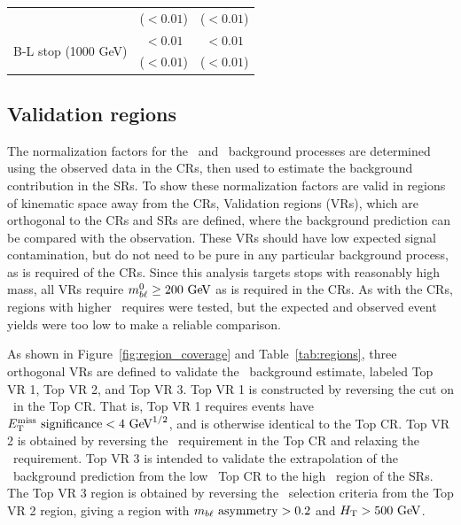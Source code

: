 \begin{table}
{\begin{tabular}{c|cc}
                                           & ($< 0.01$)                        & ($< 0.01$) \vspace{1ex}           \\
      \multirow{2}{*}{B-L stop (1000 GeV)} & $< 0.01$                          & $< 0.01$                          \\
                                           & ($< 0.01$)                        & ($< 0.01$) \vspace{1ex}           \\
      \bottomrule
    \end{tabular}
  }
\end{table}

\FloatBarrier
\subsection{Validation regions}
\label{sec:vr}

The normalization factors for the \TTBAR\ and \ZGAMMAJETS\ background processes
are determined using the observed data in the CRs, then used to estimate the
background contribution in the SRs.
To show these normalization factors are valid in regions of kinematic space away
from the CRs, Validation regions (VRs), which are orthogonal to the CRs and SRs
are defined, where the background prediction can be compared with the
observation.
These VRs should have low expected signal contamination, but do not need to be
pure in any particular background process, as is required of the CRs.
Since this analysis targets stops with reasonably high mass, all VRs require
$\MBL^0 \geq 200 \GeV$ as is required in the CRs.
As with the CRs, regions with higher \MBL\ requires were tested, but the
expected and observed event yields were too low to make a reliable comparison.

As shown in Figure~\ref{fig:region_coverage} and Table~\ref{tab:regions},
three orthogonal VRs are defined to validate the \TTBAR\ background estimate,
labeled Top VR 1, Top VR 2, and Top VR 3.
Top VR 1 is constructed by reversing the cut on \METSIG\ in the Top CR.
That is, Top VR 1 requires events have $\METSIG < 4 \GeV^{1/2}$, and is
otherwise identical to the Top CR.
Top VR 2 is obtained by reversing the \MBLASYM\ requirement in the Top CR and
relaxing the \METSIG\ requirement.
Top VR 3 is intended to validate the extrapolation of the \TTBAR\ background
prediction from the low \HT\ Top CR to the high \HT\ region of the SRs.
The Top VR 3 region is obtained by reversing the \HT\ selection criteria from
the Top VR 2 region, giving a region with $m_{b\ell}~\mathrm{asymmetry} > 0.2$ and $\HT > 500 \GeV$.

